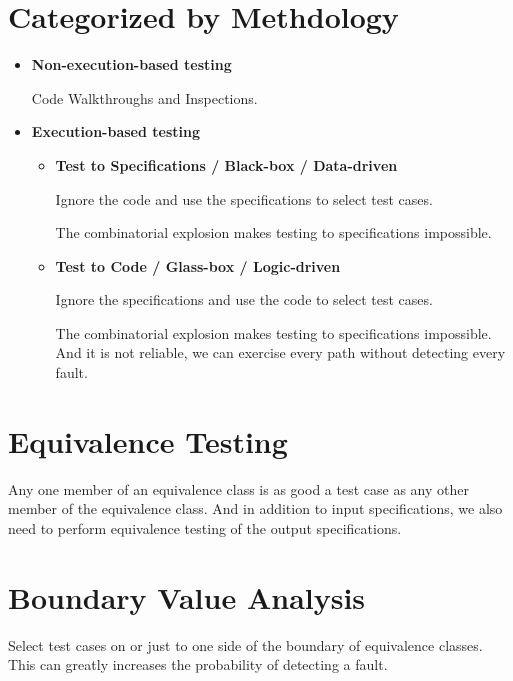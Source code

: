 \documentclass[11pt]{article}
\begin{document}
\section*{Categorized by Methdology}

\begin{itemize}
	\item \textbf{Non-execution-based testing}	
	
	Code Walkthroughs and Inspections.

	\item \textbf{Execution-based testing}
	
	\begin{itemize}
	
	\item \textbf{Test to Specifications / Black-box / Data-driven}
	
	Ignore the code and use the specifications to select test cases.
	
	The combinatorial explosion makes testing to specifications impossible.
	
	\item \textbf{Test to Code / Glass-box / Logic-driven}
	
	Ignore the specifications and use the code to select test cases.
	
	The combinatorial explosion makes testing to specifications impossible. And it is not reliable, we can exercise every path without detecting every fault.
	
	\end{itemize}
	
\end{itemize}

\section*{Equivalence Testing}

Any one member of an equivalence class is as good a test case as any other member of the equivalence class. And in addition to input specifications,  we also need to perform equivalence testing of the output specifications.


\section*{Boundary Value Analysis}

Select test cases on or just to one side of the boundary of equivalence classes. This can greatly increases the probability of detecting a fault.
\end{document}

